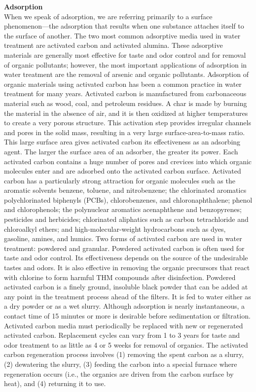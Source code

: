 \documentclass{article}
\begin{document}
\textbf{Adsorption}\\
When we speak of adsorption, we are referring primarily to a surface phenomenon—the adsorption that results when one substance attaches itself to the surface of another. The two most common adsorptive media used in water treatment are activated carbon and activated alumina. These adsorptive materials are generally most effective for taste and odor control and for removal of organic pollutants; however, the most important applications of adsorption in water treatment are the removal of arsenic and organic pollutants.
Adsorption of organic materials using activated carbon has been a common practice in water treatment for many years. Activated carbon is manufactured from carbonaceous material such as wood, coal, and petroleum residues. A char is made by burning the material in the absence of air, and it is then oxidized at higher temperatures to create a very porous structure. This activation step provides irregular channels and pores in the solid mass, resulting in a very large surface-area-to-mass ratio. This large surface area gives activated carbon its effectiveness as an adsorbing agent. The larger the surface area of an adsorber, the greater its power. Each activated carbon contains a huge number of pores and crevices into which organic molecules enter and are adsorbed onto the activated carbon surface.
Activated carbon has a particularly strong attraction for organic molecules such as the aromatic solvents benzene, toluene, and nitrobenzene; the chlorinated aromatics polychlorinated biphenyls (PCBs), chlorobenzenes, and chloronaphthalene; phenol and chlorophenols; the polynuclear aromatics acenaphthene and benzopyrenes; pesticides and herbicides; chlorinated aliphatics such as carbon tetrachloride and chloroalkyl ethers; and high-molecular-weight hydrocarbons such as dyes, gasoline, amines, and humics.
Two forms of activated carbon are used in water treatment: powdered and granular. Powdered activated carbon is often used for taste and odor control. Its effectiveness depends on the source of the undesirable tastes and odors. It is also effective in removing the organic precursors that react with chlorine to form harmful THM compounds after disinfection.
Powdered activated carbon is a finely ground, insoluble black powder that can be added at any point in the treatment process ahead of the filters. It is fed to water either as a dry powder or as a wet slurry. Although adsorption is nearly instantaneous, a contact time of 15 minutes or more is desirable before sedimentation or filtration. Activated carbon media must periodically be replaced with new or regenerated activated carbon. Replacement cycles can vary from 1 to 3 years for taste and odor treatment to as little as 4 or 5 weeks for removal of organics. The activated carbon regeneration process involves (1) removing the spent carbon as a slurry, (2) dewatering the slurry, (3) feeding the carbon into a special furnace where regeneration occurs (i.e., the organics are driven from the carbon surface by heat), and (4) returning it to use.
\end{document}
